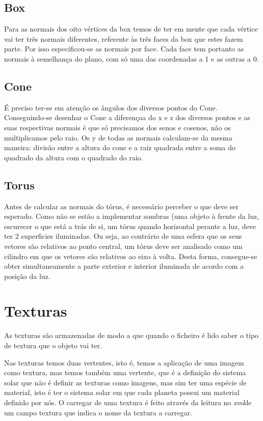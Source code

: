 \subsection{Box}
Para as normais dos oito vértices da box temos de ter em mente que cada vértice vai ter três normais diferentes, referente às três faces da box que estes fazem parte. Por isso especificou-se as normais por face. Cada face tem portanto as normais à semelhança do plano, com só uma das coordenadas a 1 e as outras a 0.

\subsection{Cone}
É preciso ter-se em atenção os ângulos dos diversos pontos do Cone.
Conseguindo-se desenhar o Cone a diferençaa do x e z dos diversos pontos e as suas respectivas normais é  que só precisamos dos senos e cosenos, não os multiplicamos pelo raio. Os y de todas as normais calculam-se da mesma maneira: divisão entre a altura do cone e a raiz quadrada entre a soma do quadrado da altura com o quadrado do raio.


\subsection{Torus}

Antes de calcular as normais do tórus, é necessário perceber o que deve ser esperado. Como não se estão a implementar sombras (uma objeto à frente da luz, escurecer o que está a trás de si, um tórus quando horizontal perante a luz, deve ter 2 superficies iluminadas. Ou seja, ao contrário de uma esfera que os seus vetores são relativos ao ponto central, um tórus deve ser analisado como um cilindro em que os vetores são relativos ao eixo à volta. Desta forma, consegue-se obter simultaneamente a parte exterior e interior
iluminada de acordo com a posição da luz.




\section{Texturas}

As texturas são armazenadas de modo a que quando o ficheiro é lido saber o tipo de textura que o objeto vai ter.


Nas texturas  temos duas vertentes, isto é, temos a aplicação de uma imagem como textura, mas temos também uma vertente, que é a definição do sistema solar que não é definir as texturas como imagens, mas sim ter uma espécie de material, isto é ter o sistema solar em que cada planeta possui um material definido por nós.
O carregar de uma textura é feito através da leitura no \textit{xml}de um campo textura que indica o nome da textura a carregar.




